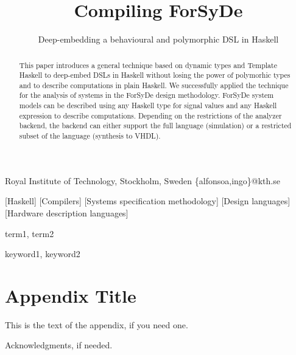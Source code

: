 \documentclass[preprint,natbib]{sigplanconf}
\begin{document}

\preprintfooter{}                                             %

\title{Compiling ForSyDe}
\subtitle{Deep-embedding a behavioural and polymorphic DSL in Haskell}

           {Royal Institute of Technology, Stockholm, Sweden}
           {\{alfonsoa,ingo\}@kth.se}

\maketitle

\begin{abstract}
This paper introduces a general technique based on dynamic types and Template Haskell to deep-embed DSLs in Haskell without losing the power of polymorhic types and to describe computations in plain Haskell. We successfully applied the technique for the analysis of systems in the ForSyDe design methodology. ForSyDe system models can be described using any Haskell type for signal values and any Haskell expression to describe computations. Depending on the restrictions of the analyzer backend, the backend can either support the full language (simulation) or a restricted subset of the language (synthesis to VHDL). 

\end{abstract}

[Haskell]
[Compilers]
[Systems specification methodology]
[Design languages]
[Hardware description languages]

\terms
term1, term2

\keywords
keyword1, keyword2










\appendix

\section{Appendix Title}

This is the text of the appendix, if you need one.

\acks

Acknowledgments, if needed.



\end{document}
